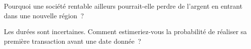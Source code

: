 \begin{interviewq}\label{iq:fm:entering-a-new-market:5}
Pourquoi une société rentable ailleurs pourrait-elle perdre de l'argent en entrant dans une nouvelle région~?
\end{interviewq}

\begin{interviewq}\label{iq:fm:entering-a-new-market:6}
Les durées sont incertaines. Comment estimeriez-vous la probabilité de réaliser sa première transaction avant une date donnée~?
\end{interviewq}
